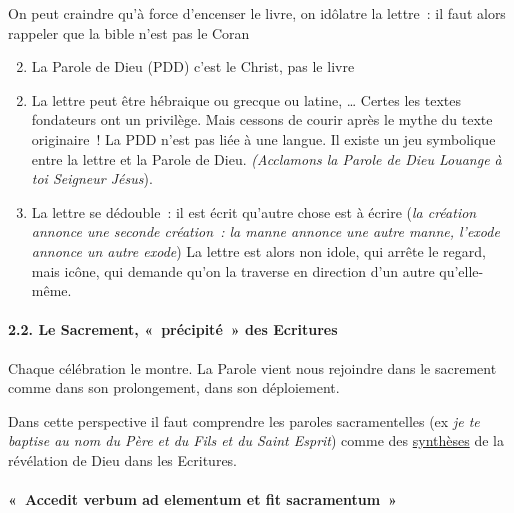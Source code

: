 On peut craindre qu'à force d'encenser le livre, on idôlatre la lettre~:
il faut alors rappeler que la bible n'est pas le Coran

\begin{enumerate}
\setcounter{enumi}{1}
\item
  La Parole de Dieu (PDD) c'est le Christ, pas le livre
\end{enumerate}

\begin{enumerate}
\setcounter{enumi}{1}
\item
  La lettre peut être hébraique ou grecque ou latine, \ldots{} Certes
  les textes fondateurs ont un privilège. Mais cessons de courir après
  le mythe du texte originaire~! La PDD n'est pas liée à une langue. Il
  existe un jeu symbolique entre la lettre et la Parole de Dieu.
  \emph{(Acclamons la Parole de Dieu Louange à toi Seigneur Jésus}).
\item
  La lettre se dédouble~: il est écrit qu'autre chose est à écrire
  (\emph{la création annonce une seconde création~: la manne annonce une
  autre manne, l'exode annonce un autre exode}) La lettre est alors non
  idole, qui arrête le regard, mais icône, qui demande qu'on la traverse
  en direction d'un autre qu'elle-même.
\end{enumerate}

\hypertarget{le-sacrement-pruxe9cipituxe9-des-ecritures}{%
\paragraph{\texorpdfstring{2.2. Le Sacrement, «~précipité~» des
Ecritures
}{2.2. Le Sacrement, «~précipité~» des Ecritures }}\label{le-sacrement-pruxe9cipituxe9-des-ecritures}}

Chaque célébration le montre. La Parole vient nous rejoindre dans le
sacrement comme dans son prolongement, dans son déploiement.

Dans cette perspective il faut comprendre les paroles sacramentelles (ex
\emph{je te baptise au nom du Père et du Fils et du Saint Esprit}) comme
des \underline{synthèses} de la révélation de Dieu dans les Ecritures.

\hypertarget{a-accedit-verbum-ad-elementum-et-fit-sacramentum}{%
\paragraph{«~Accedit verbum ad elementum et fit
sacramentum~»}\label{a-accedit-verbum-ad-elementum-et-fit-sacramentum}}

